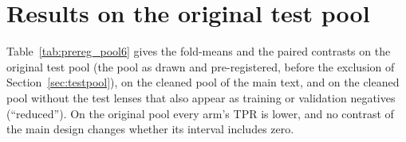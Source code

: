 \section{Results on the original test pool}
\label{app:prereg_pool}

Table~\ref{tab:prereg_pool6} gives the fold-means and the paired contrasts on the original test
pool (the pool as drawn and pre-registered, before the exclusion of
Section~\ref{sec:testpool}), on the cleaned pool of the main text, and on the cleaned pool without the \DTwoPositives{} test lenses that also appear as
training or validation negatives (``reduced''). On the original pool every arm's TPR is lower,
and no contrast of the main design changes whether its interval includes zero.


